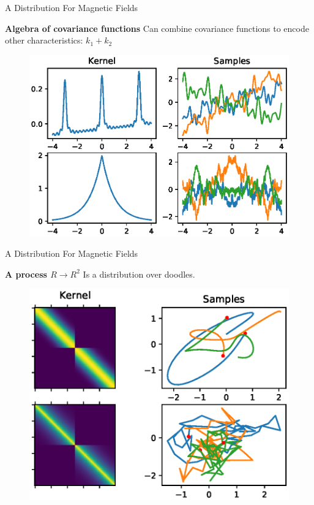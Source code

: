 \documentclass{beamer}
\begin{document}
\begin{frame}{A Distribution For Magnetic Fields}

  \textbf{Algebra of covariance functions} Can combine covariance functions to encode other characteristics: $k_1 + k_2$

  \begin{figure}
    \includegraphics[width=\linewidth]{plots/sum.eps}
  \end{figure}

\end{frame}


\begin{frame}{A Distribution For Magnetic Fields}

  \textbf{A process $R \rightarrow R^2$} Is a distribution over doodles.
  \begin{figure}
    \includegraphics[width=\linewidth]{plots/parametric_curves.eps}
  \end{figure}

\end{frame}
\end{document}
